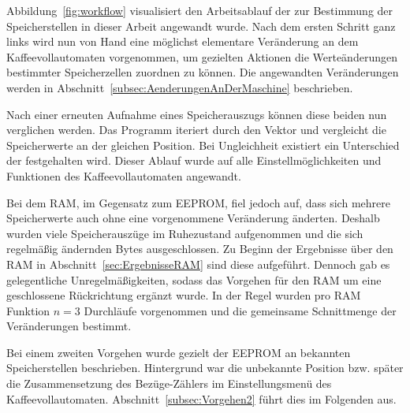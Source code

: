 Abbildung~\ref{fig:workflow} visualisiert den Arbeitsablauf der zur Bestimmung der Speicherstellen in dieser Arbeit angewandt wurde.
Nach dem ersten Schritt ganz links wird nun von Hand eine möglichst elementare Veränderung an dem Kaffeevollautomaten vorgenommen, um gezielten Aktionen die Werteänderungen bestimmter Speicherzellen zuordnen zu können.
Die angewandten Veränderungen werden in Abschnitt~\ref{subsec:AenderungenAnDerMaschine} beschrieben.

Nach einer erneuten Aufnahme eines Speicherauszugs können diese beiden nun verglichen werden.
Das Programm iteriert durch den Vektor und vergleicht die Speicherwerte an der gleichen Position.
Bei Ungleichheit existiert ein Unterschied der festgehalten wird.
Dieser Ablauf wurde auf alle Einstellmöglichkeiten und Funktionen des Kaffeevollautomaten angewandt.

Bei dem \ac{RAM}, im Gegensatz zum \ac{EEPROM}, fiel jedoch auf, dass sich mehrere Speicherwerte auch ohne eine vorgenommene Veränderung änderten.
Deshalb wurden viele Speicherauszüge im Ruhezustand aufgenommen und die sich regelmäßig ändernden Bytes ausgeschlossen.
Zu Beginn der Ergebnisse über den \ac{RAM} in Abschnitt~\ref{sec:ErgebnisseRAM} sind diese aufgeführt.
Dennoch gab es gelegentliche Unregelmäßigkeiten, sodass das Vorgehen für den \ac{RAM} um eine geschlossene Rückrichtung ergänzt wurde.
In der Regel wurden pro \ac{RAM} Funktion $n=3$ Durchläufe vorgenommen und die gemeinsame Schnittmenge der Veränderungen bestimmt.

Bei einem zweiten Vorgehen wurde gezielt der \ac{EEPROM} an bekannten Speicherstellen beschrieben.
Hintergrund war die unbekannte Position bzw. später die Zusammensetzung des Bezüge-Zählers im Einstellungsmenü des Kaffeevollautomaten.
Abschnitt~\ref{subsec:Vorgehen2} führt dies im Folgenden aus.

